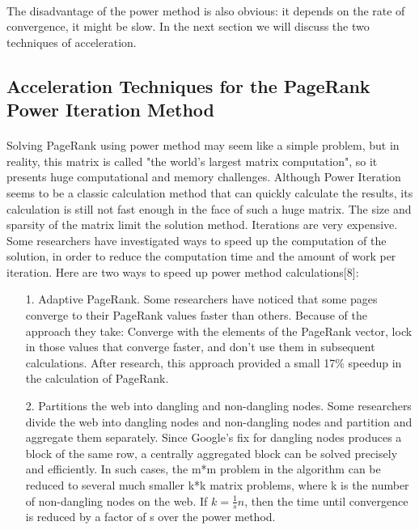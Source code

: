 \documentclass[12pt]{article}
\begin{document}
\paragraph{} The disadvantage of the power method is also obvious: it depends on the rate of convergence, it might be slow. In the next section we will discuss the two techniques of acceleration.

\subsection{Acceleration Techniques for the PageRank Power Iteration Method}
\paragraph{}Solving PageRank using power method may seem like a simple problem, but in reality, this matrix is called "the world's largest matrix computation", so it presents huge computational and memory challenges. Although Power Iteration seems to be a classic calculation method that can quickly calculate the results, its calculation is still not fast enough in the face of such a huge matrix. The size and sparsity of the matrix limit the solution method. Iterations are very expensive. Some researchers have investigated ways to speed up the computation of the solution, in order to reduce the computation time and the amount of work per iteration. Here are two ways to speed up power method calculations[8]:
\begin{itemize}
    \item[1.] Adaptive PageRank. Some researchers have noticed that some pages converge to their PageRank values faster than others. Because of the approach they take: Converge with the elements of the PageRank vector, lock in those values that converge faster, and don't use them in subsequent calculations. After research, this approach provided a small 17\% speedup in the calculation of PageRank.
    \item[2.] Partitions the web into dangling and non-dangling nodes. Some researchers divide the web into dangling nodes and non-dangling nodes and partition and aggregate them separately. Since Google's fix for dangling nodes produces a block of the same row, a centrally aggregated block can be solved precisely and efficiently. In such cases, the m*m problem in the algorithm can be reduced to several much smaller k*k matrix problems, where k is the number of non-dangling nodes on the web. If $k = \frac{1}{s}n$, then the time until convergence is reduced by a factor of s over the power method.
\end{itemize}
\end{document}
